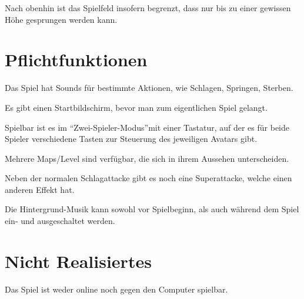 \documentclass[11pt]{article}
\newcommand{\paragraphspace}{0.3cm}
\begin{document}
    \noindent
    Nach obenhin ist das Spielfeld insofern begrenzt, dass nur bis zu einer gewissen H\"ohe gesprungen werden kann.

    \section{Pflichtfunktionen}\label{sec:muss}
    Das Spiel hat Sounds f\"ur bestimmte Aktionen, wie Schlagen, Springen, Sterben.
    \vspace{\paragraphspace}

    \noindent
    Es gibt einen Startbildschirm, bevor man zum eigentlichen Spiel gelangt.
    \vspace{\paragraphspace}

    \noindent
    Spielbar ist es im \textquotedblleft Zwei-Spieler-Modus\textquotedblright mit einer Tastatur, auf der es f\"ur beide Spieler verschiedene
    Tasten zur Steuerung des jeweiligen Avatars gibt.
    \vspace{\paragraphspace}

    \noindent
    Mehrere Maps/Level sind verf\"ugbar, die sich in ihrem Aussehen unterscheiden.
    \vspace{\paragraphspace}

    \noindent
    Neben der normalen Schlagattacke gibt es noch eine Superattacke, welche einen anderen Effekt hat.
    \vspace{\paragraphspace}

    \noindent
    Die Hintergrund-Musik kann sowohl vor Spielbeginn, als auch w\"ahrend dem Spiel ein- und ausgeschaltet werden.

    \section{Nicht Realisiertes}\label{sec:kann-nicht}

    Das Spiel ist weder online noch gegen den Computer spielbar.
    \vspace{\paragraphspace}
\end{document}
